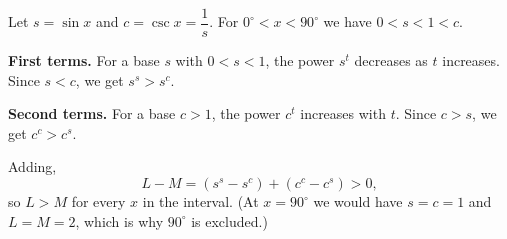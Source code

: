 Let $s=\sin x$ and $c=\csc x=\dfrac{1}{s}$. For $0^\circ<x<90^\circ$ we have $0<s<1<c$.

\textbf{First terms.} For a base $s$ with $0<s<1$, the power $s^t$ decreases as $t$ increases. Since $s<c$, we get $s^s>s^c$.

\textbf{Second terms.} For a base $c>1$, the power $c^t$ increases with $t$. Since $c>s$, we get $c^c>c^s$.

Adding,
\[
L-M=\left(s^s-s^c\right)+\left(c^c-c^s\right)>0,
\]
so $\boxed{L>M}$ for every $x$ in the interval. (At $x=90^\circ$ we would have $s=c=1$ and $L=M=2$, which is why $90^\circ$ is excluded.)
